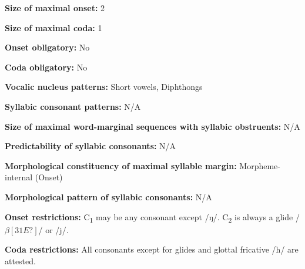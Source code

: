 \begin{styleBody}
\textbf{Size of maximal onset:} 2
\end{styleBody}

\begin{styleBody}
\textbf{Size of maximal coda:} 1
\end{styleBody}

\begin{styleBody}
\textbf{Onset obligatory:} No
\end{styleBody}

\begin{styleBody}
\textbf{Coda obligatory:} No
\end{styleBody}

\begin{styleBody}
\textbf{Vocalic nucleus patterns:} Short vowels, Diphthongs
\end{styleBody}

\begin{styleBody}
\textbf{Syllabic consonant patterns:} N/A
\end{styleBody}

\begin{styleBody}
\textbf{Size of maximal word{}-marginal sequences with syllabic obstruents:} N/A
\end{styleBody}

\begin{styleBody}
\textbf{Predictability of syllabic consonants:} N/A
\end{styleBody}

\begin{styleBody}
\textbf{Morphological constituency of maximal syllable margin:} Morpheme-internal (Onset)
\end{styleBody}

\begin{styleBody}
\textbf{Morphological pattern of syllabic consonants:} N/A
\end{styleBody}

\begin{styleBody}
\textbf{Onset restrictions: }C\textsubscript{1} may be any consonant except /ŋ/. C\textsubscript{2} is always a glide /$\beta [31E?]$/ or /j/.
\end{styleBody}

\begin{styleBody}
\textbf{Coda restrictions: }All consonants except for glides and glottal fricative /h/ are attested.
\end{styleBody}

